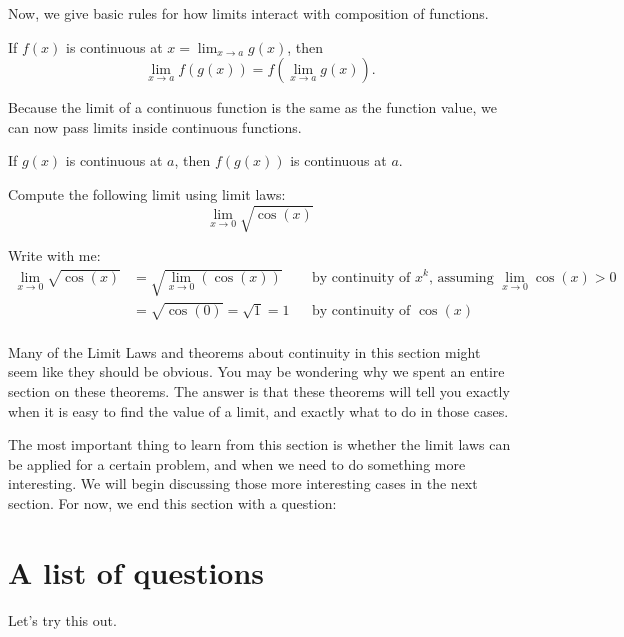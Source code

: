 \documentclass{ximera}
\begin{document}
Now, we give basic rules for how limits interact with composition
of functions.

\begin{theorem}
  If $f(x)$ is continuous at $x = \lim_{x\to a} g(x)$, then
  \[
  \lim_{x\to a} f(g(x)) = f(\lim_{x\to a} g(x)).
  \]
\end{theorem}

Because the limit of a continuous function is the same as the function
value, we can now pass limits inside continuous functions.

\begin{corollary}
If $g(x)$ is continuous at $a$, then $f(g(x))$ is continuous at $a$.
\end{corollary}

\begin{example}
  Compute the following limit using limit laws:
  \[
  \lim_{x \to 0} \sqrt{\cos(x)}
  \]
  \begin{explanation}
    Write with me:
\begin{align*}
  \lim_{x \to 0} \sqrt{\cos(x)} &= 
  \sqrt{\lim_{x \to 0} (\cos(x))} &&\text{by continuity of $x^k$, assuming $\lim_{x \to 0} \cos(x) >0$}\\
  &= \sqrt{\cos(0)} = \sqrt{1} = 1 &&\text{by continuity of $\cos(x)$}\\
\end{align*}
\end{explanation}
\end{example}

Many of the Limit Laws and theorems about continuity in this section
might seem like they should be obvious.  You may be wondering why we
spent an entire section on these theorems.  The answer is that these
theorems will tell you exactly when it is easy to find the value of a
limit, and exactly what to do in those cases.

The most important thing to learn from this section is whether the
limit laws can be applied for a certain problem, and when we need to
do something more interesting.  We will begin discussing those more
interesting cases in the next section.  For now, we end this section
with a question:

\section{A list of questions}

Let's try this out.
\end{document}
